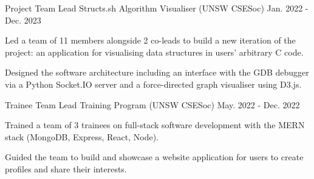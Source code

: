 

\begin{cventries}

  \cventry
    {Project Team Lead} %
    {Structs.sh Algorithm Visualiser (UNSW CSESoc)} %
    {Jan. 2022 - Dec. 2023} %
    {} %
    {
      \begin{cvitems} %
        \item {Led a team of 11 members alongside 2 co-leads to build a new iteration of the project: an application for visualising data structures in users' arbitrary C code.}
        \item {Designed the software architecture including an interface with the GDB debugger via a Python Socket.IO server and a force-directed graph visualiser using D3.js.}
      \end{cvitems}
    }

  \cventry
    {Trainee Team Lead} %
    {Training Program (UNSW CSESoc)} %
    {May. 2022 - Dec. 2022} %
    {} %
    {
      \begin{cvitems} %
        \item {Trained a team of 3 trainees on full-stack software development with the MERN stack (MongoDB, Express, React, Node).}
        \item {Guided the team to build and showcase a website application for users to create profiles and share their interests.}
      \end{cvitems}
    }

\end{cventries}
